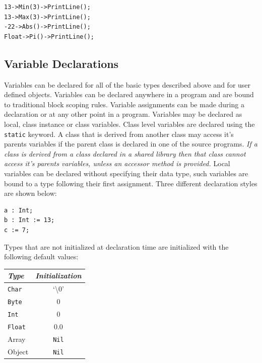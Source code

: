 \documentclass[12pt]{article}
\begin{document}
\begin{verbatim}
13->Min(3)->PrintLine();
13->Max(3)->PrintLine();
-22->Abs()->PrintLine();
Float->Pi()->PrintLine();
\end{verbatim}

\subsection{Variable Declarations}
Variables can be declared for all of the basic types described above and for user defined objects. Variables can be declared anywhere in a program and are bound to traditional block scoping rules.  Variable assignments can be made during a declaration or at any other point in a program. Variables may be declared as local, class instance or class variables.  Class level variables are declared using the \texttt{static} keyword. A class that is derived from another class may access it's parents variables if the parent class is declared in one of the source programs.  \textit{If a class is derived from a class declared in a shared library then that class cannot access it's parents variables, unless an accessor method is provided.}  Local variables can be declared without specifying their data type, such variables are bound to a type following their first assignment. Three different declaration styles are shown below:

\begin{verbatim}
a : Int;
b : Int := 13;
c := 7;
\end{verbatim}

Types that are not initialized at declaration time are initialized with the following default values:

\vspace{\baselineskip}
\begin{center}
\begin{tabular}{| l | c |}
\hline
\emph{Type} & \emph{Initialization} \\ \hline \hline
\texttt{Char} & `\textbackslash0' \\ \hline
\texttt{Byte} & 0 \\ \hline
\texttt{Int} & 0 \\ \hline
\texttt{Float} & 0.0 \\ \hline
Array & \texttt{Nil} \\ \hline
Object & \texttt{Nil} \\ \hline
\end{tabular}
\end{center}
\end{document}
